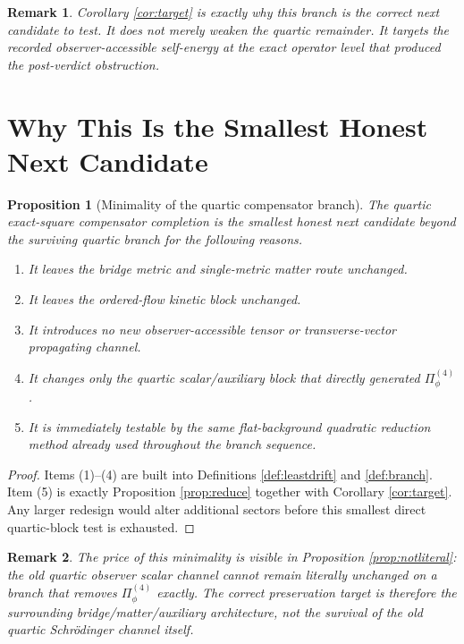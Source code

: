 \documentclass[11pt]{article}
\newtheorem{proposition}{Proposition}
\newtheorem{remark}{Remark}
\begin{document}
\begin{remark}
Corollary \ref{cor:target} is exactly why this branch is the correct next candidate to test. It does not merely weaken the quartic remainder. It targets the recorded observer-accessible self-energy at the exact operator level that produced the post-verdict obstruction.
\end{remark}

\section{Why This Is the Smallest Honest Next Candidate}

\begin{proposition}[Minimality of the quartic compensator branch]
\label{prop:minimal}
The quartic exact-square compensator completion is the smallest honest next candidate beyond the surviving quartic branch for the following reasons.
\begin{enumerate}
    \item It leaves the bridge metric and single-metric matter route unchanged.
    \item It leaves the ordered-flow kinetic block unchanged.
    \item It introduces no new observer-accessible tensor or transverse-vector propagating channel.
    \item It changes only the quartic scalar/auxiliary block that directly generated \(\Pi_\phi^{(4)}\).
    \item It is immediately testable by the same flat-background quadratic reduction method already used throughout the branch sequence.
\end{enumerate}
\end{proposition}

\begin{proof}
Items (1)--(4) are built into Definitions \ref{def:leastdrift} and \ref{def:branch}. Item (5) is exactly Proposition \ref{prop:reduce} together with Corollary \ref{cor:target}. Any larger redesign would alter additional sectors before this smallest direct quartic-block test is exhausted.
\end{proof}

\begin{remark}
The price of this minimality is visible in Proposition \ref{prop:notliteral}: the old quartic observer scalar channel cannot remain literally unchanged on a branch that removes \(\Pi_\phi^{(4)}\) exactly. The correct preservation target is therefore the surrounding bridge/matter/auxiliary architecture, not the survival of the old quartic Schr\"odinger channel itself.
\end{remark}
\end{document}
